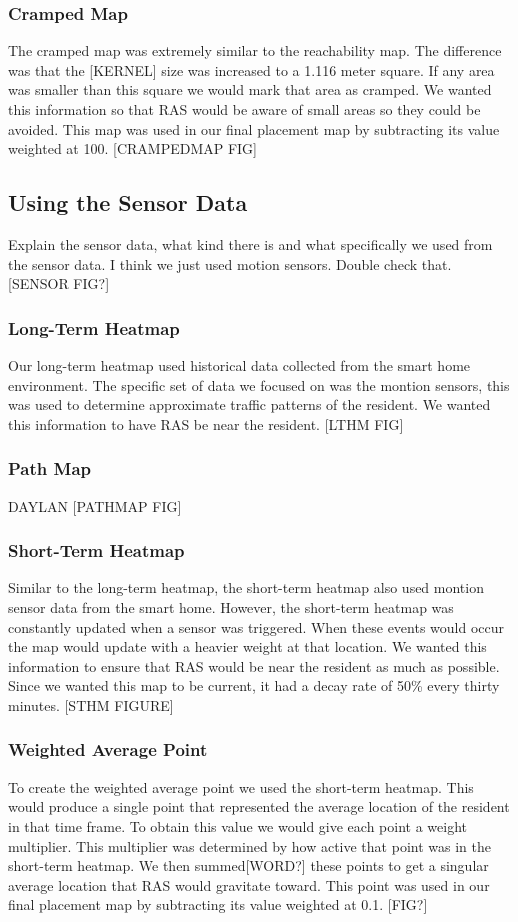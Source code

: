 \documentclass[11pt, draft, a4paper]{IEEEtran}
\begin{document}
\subsubsection{Cramped Map}
The cramped map was extremely similar to the reachability map. The difference was that the [KERNEL] size was increased to a 1.116 meter square. If any area was smaller than this square we would mark that area as cramped. We wanted this information so that RAS would be aware of small areas so they could be avoided. This map was used in our final placement map by subtracting its value weighted at 100. [CRAMPEDMAP FIG]


\subsection{Using the Sensor Data}
Explain the sensor data, what kind there is and what specifically we used from the sensor data. I think we just used motion sensors. Double check that. [SENSOR FIG?]


\subsubsection{Long-Term Heatmap}
Our long-term heatmap used historical data collected from the smart home environment. The specific set of data we focused on was the montion sensors, this was used to determine approximate traffic patterns of the resident. We wanted this information to have RAS be near the resident. [LTHM FIG]


\subsubsection{Path Map}
DAYLAN
[PATHMAP FIG]


\subsubsection{Short-Term Heatmap}
Similar to the long-term heatmap, the short-term heatmap also used montion sensor data from the smart home. However, the short-term heatmap was constantly updated when a sensor was triggered. When these events would occur the map would update with a heavier weight at that location. We wanted this information to ensure that RAS would be near the resident as much as possible. Since we wanted this map to be current, it had a decay rate of 50\% every thirty minutes. [STHM FIGURE]


\subsubsection{Weighted Average Point}
To create the weighted average point we used the short-term heatmap. This would produce a single point that represented the average location of the resident in that time frame. To obtain this value we would give each point a weight multiplier. This multiplier was determined by how active that point was in the short-term heatmap. We then summed[WORD?] these points to get a singular average location that RAS would gravitate toward. This point was used in our final placement map by subtracting its value weighted at 0.1. [FIG?]
\end{document}
